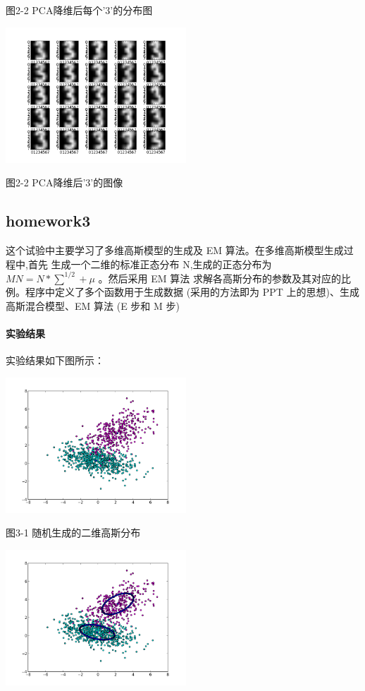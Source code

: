 \documentclass[10pt,a4paper]{article}
\theoremstyle{mythm}%
\numberwithin{equation}{section}
\begin{document}
 图2-2  PCA降维后每个’3’的分布图
 
  \includegraphics[height=2in]{figure2-3.png} 
  
图2-2  PCA降维后’3’的图像


\subsection{homework3}
这个试验中主要学习了多维高斯模型的生成及 EM 算法。在多维高斯模型生成过程中,首先 生成一个二维的标准正态分布 N,生成的正态分布为$MN=N*\sum^{1/2}+\mu$
。然后采用 EM 算法 求解各高斯分布的参数及其对应的比例。程序中定义了多个函数用于生成数据 (采用的方法即为 PPT 上的思想)、生成高斯混合模型、EM 算法 (E 步和 M 步)
 \paragraph{实验结果}实验结果如下图所示：
 
 \includegraphics[height=2in]{figure3-1.png} 
 
图3-1  随机生成的二维高斯分布

 \includegraphics[height=2in]{figure3-2.png} 
 
\end{document}
